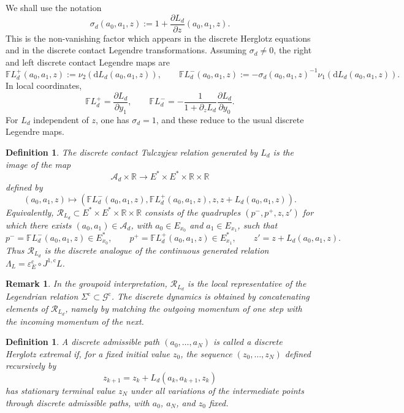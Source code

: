 \documentclass[11pt]{article}
\newtheorem{definition}[theorem]{Definition}
\newtheorem{remark}[theorem]{Remark}
\newcommand{\R}{\mathbb{R}}
\newcommand{\dd}{\mathrm{d}}
\newcommand{\mc}[1]{\mathcal{#1}}
\newcommand{\FL}{\mathbb{F}L}
\begin{document}
We shall use the notation
\[
\sigma_d(a_0,a_1,z):=1+\frac{\partial L_d}{\partial z}(a_0,a_1,z).
\]
This is the non-vanishing factor which appears in the discrete Herglotz
equations and in the discrete contact Legendre transformations. Assuming \(\sigma_d\neq 0\), the right and left discrete contact Legendre maps
are
\[
\FL_d^+(a_0,a_1,z):=\nu_2(\dd L_d(a_0,a_1,z)),
\qquad
\FL_d^-(a_0,a_1,z):=
-\sigma_d(a_0,a_1,z)^{-1}\nu_1(\dd L_d(a_0,a_1,z)).
\]
In local coordinates,
\[
\FL_d^+=\frac{\partial L_d}{\partial y_1},
\qquad
\FL_d^-=-\frac{1}{1+\partial_zL_d}\frac{\partial L_d}{\partial y_0}.
\]
For \(L_d\) independent of \(z\), one has \(\sigma_d=1\), and these reduce to
the usual discrete Legendre maps.

\begin{definition}The discrete contact Tulczyjew relation generated by \(L_d\) is the image of the
map
\[
\mc A_d\times\R\longrightarrow E^*\times E^*\times\R\times\R
\]
defined by
\[
(a_0,a_1,z)\longmapsto
\left(
\FL_d^-(a_0,a_1,z),
\FL_d^+(a_0,a_1,z),
z,
z+L_d(a_0,a_1,z)
\right).
\]
Equivalently, \(\mc R_{L_d}\subset E^*\times E^*\times\R\times\R\) consists of
the quadruples \((p^-,p^+,z,z')\) for which there exists
\((a_0,a_1)\in\mc A_d\), with \(a_0\in E_{x_0}\) and \(a_1\in E_{x_1}\), such
that
\[
p^-=\FL_d^-(a_0,a_1,z)\in E^*_{x_0},
\qquad
p^+=\FL_d^+(a_0,a_1,z)\in E^*_{x_1},
\qquad
z'=z+L_d(a_0,a_1,z).
\]
Thus \(\mc R_{L_d}\) is the discrete analogue of the continuous generated
relation \(\Lambda_L=\varepsilon_E^{\mathrm c}\circ J^{1,\mathrm c}L\).\end{definition} 


\begin{remark} In
the groupoid interpretation, $\mc R_{L_d}$ is the local representative of the Legendrian
relation \(\Sigma^{\mathrm c}\subset\mathcal G^{\mathrm c}\). The discrete
dynamics is obtained by concatenating elements of \(\mc R_{L_d}\), namely by
matching the outgoing momentum of one step with the incoming momentum of the
next.\end{remark}

\begin{definition}
A discrete admissible path \((a_0,\dots,a_N)\) is called a discrete Herglotz
extremal if, for a fixed initial value \(z_0\), the sequence
\((z_0,\dots,z_N)\) defined recursively by
\[
z_{k+1}=z_k+L_d(a_k,a_{k+1},z_k)
\]
has stationary terminal value \(z_N\) under all variations of the intermediate
points through discrete admissible paths, with \(a_0\), \(a_N\), and \(z_0\)
fixed. \end{definition}
\end{document}
